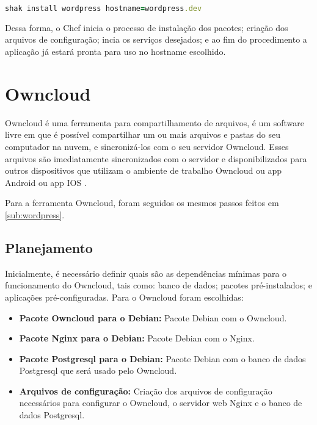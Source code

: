 \begin{lstlisting}[language=Ruby,label=dice_index,caption={Exemplo de exexução de instalação do wordpress com shak}]
shak install wordpress hostname=wordpress.dev
\end{lstlisting}

Dessa forma, o Chef inicia o processo de instalação dos pacotes; criação dos arquivos
de configuração; incia os serviços desejados; e ao fim do procedimento a aplicação
já estará pronta para uso no hostname escolhido.

\section{Owncloud}
\label{sub:owncloud}

Owncloud é uma ferramenta para compartilhamento de arquivos, é um software 
livre em que é possível compartilhar
um ou mais arquivos e pastas do seu computador na nuvem, e sincronizá-los com o seu
servidor Owncloud. Esses arquivos são imediatamente sincronizados com o servidor
e disponibilizados para outros dispositivos que utilizam o ambiente de trabalho
Owncloud ou app Android ou app IOS \cite{owncloud} .

Para a ferramenta Owncloud, foram seguidos os mesmos passos feitos em 
\ref{sub:wordpress}.

\subsection{Planejamento}

Inicialmente, é necessário definir quais são as dependências
mínimas para o funcionamento do Owncloud, tais como: banco de dados; pacotes
pré-instalados; e aplicações pré-configuradas. Para o Owncloud foram escolhidas:

\begin{itemize}
   \item \textbf{Pacote Owncloud para o Debian:} Pacote Debian com o Owncloud.
   \item \textbf{Pacote Nginx para o Debian:} Pacote Debian com o Nginx.
   \item \textbf{Pacote Postgresql para o Debian:} Pacote Debian com o banco de dados Postgresql
   que será usado pelo Owncloud.
   \item \textbf{Arquivos de configuração:} Criação dos arquivos de configuração
   necessários para configurar o Owncloud, o servidor web Nginx e o banco de dados
   Postgresql.
\end{itemize}

